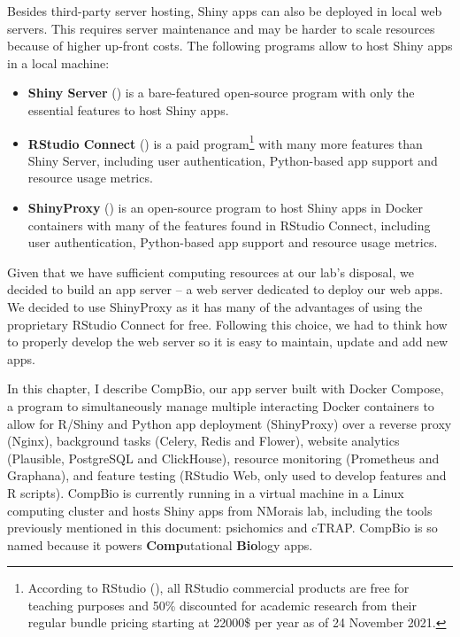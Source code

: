 Besides third-party server hosting, Shiny apps can also be deployed in local web servers. This requires server maintenance and may be harder to scale resources because of higher up-front costs. The following programs allow to host Shiny apps in a local machine:

\begin{itemize}
	\item \textbf{Shiny Server} () is a bare-featured open-source program with only the essential features to host Shiny apps.
	\item \textbf{RStudio Connect} () is a paid program\footnote{According to RStudio (), all RStudio commercial products are free for teaching purposes and 50\% discounted for academic research from their regular bundle pricing starting at 22000\$ per year as of 24 November 2021.} with many more features than Shiny Server, including user authentication, Python-based app support and resource usage metrics.
	\item \textbf{ShinyProxy} () is an open-source program to host Shiny apps in Docker containers with many of the features found in RStudio Connect, including user authentication, Python-based app support and resource usage metrics.
\end{itemize}

Given that we have sufficient computing resources at our lab's disposal, we decided to build an app server -- a web server dedicated to deploy our web apps. We decided to use ShinyProxy as it has many of the advantages of using the proprietary RStudio Connect for free. Following this choice, we had to think how to properly develop the web server so it is easy to maintain, update and add new apps.


In this chapter, I describe CompBio, our app server built with Docker Compose, a program to simultaneously manage multiple interacting Docker containers to allow for R/Shiny and Python app deployment (ShinyProxy) over a reverse proxy (Nginx), background tasks (Celery, Redis and Flower), website analytics (Plausible, PostgreSQL and ClickHouse), resource monitoring (Prometheus and Graphana), and feature testing (RStudio Web, only used to develop features and R scripts). CompBio is currently running in a virtual machine in a Linux computing cluster and hosts Shiny apps from NMorais lab, including the tools previously mentioned in this document: psichomics and cTRAP. CompBio is so named because it powers \textbf{Comp}utational \textbf{Bio}logy apps.

